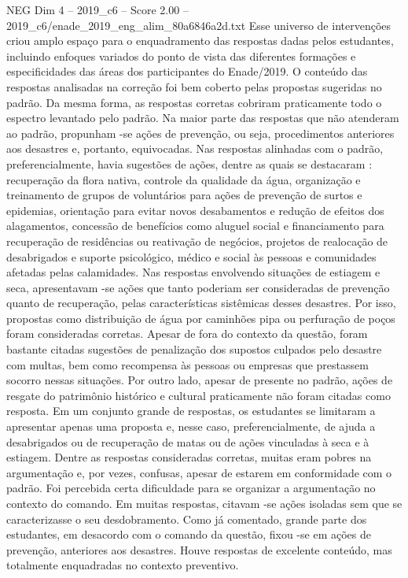 \begin{textsample}{NEG Dim 4 – 2019\_c6 – Score 2.00 – 2019\_c6/enade\_2019\_eng\_alim\_80a6846a2d.txt}
Esse universo de intervenções criou amplo espaço para o enquadramento das respostas dadas pelos estudantes, incluindo enfoques variados do ponto de vista das diferentes formações e especificidades das áreas dos participantes do Enade/2019.
O conteúdo das respostas analisadas na correção foi bem coberto pelas propostas sugeridas no padrão.
Da mesma forma, as respostas corretas cobriram praticamente todo o espectro levantado pelo padrão.
Na maior parte das respostas que não atenderam ao padrão, propunham -se ações de prevenção, ou seja, procedimentos anteriores aos desastres e, portanto, equivocadas.
Nas respostas alinhadas com o padrão, preferencialmente, havia sugestões de ações, dentre as quais se destacaram : recuperação da flora nativa, controle da qualidade da água, organização e treinamento de grupos de voluntários para ações de prevenção de surtos e epidemias, orientação para evitar novos desabamentos e redução de efeitos dos alagamentos, concessão de benefícios como aluguel social e financiamento para recuperação de residências ou reativação de negócios, projetos de realocação de desabrigados e suporte psicológico, médico e social às pessoas e comunidades afetadas pelas calamidades.
Nas respostas envolvendo situações de estiagem e seca, apresentavam -se ações que tanto poderiam ser consideradas de prevenção quanto de recuperação, pelas características sistêmicas desses desastres.
Por isso, propostas como distribuição de água por caminhões pipa ou perfuração de poços foram consideradas corretas.
Apesar de fora do contexto da questão, foram bastante citadas sugestões de penalização dos supostos culpados pelo desastre com multas, bem como recompensa às pessoas ou empresas que prestassem socorro nessas situações.
Por outro lado, apesar de presente no padrão, ações de resgate do patrimônio histórico e cultural praticamente não foram citadas como resposta.
Em um conjunto grande de respostas, os estudantes se limitaram a apresentar apenas uma proposta e, nesse caso, preferencialmente, de ajuda a desabrigados ou de recuperação de matas ou de ações vinculadas à seca e à estiagem.
Dentre as respostas consideradas corretas, muitas eram pobres na argumentação e, por vezes, confusas, apesar de estarem em conformidade com o padrão.
Foi percebida certa dificuldade para se organizar a argumentação no contexto do comando.
Em muitas respostas, citavam -se ações isoladas sem que se caracterizasse o seu desdobramento.
Como já comentado, grande parte dos estudantes, em desacordo com o comando da questão, fixou -se em ações de prevenção, anteriores aos desastres.
Houve respostas de excelente conteúdo, mas totalmente enquadradas no contexto preventivo.

\end{textsample}
